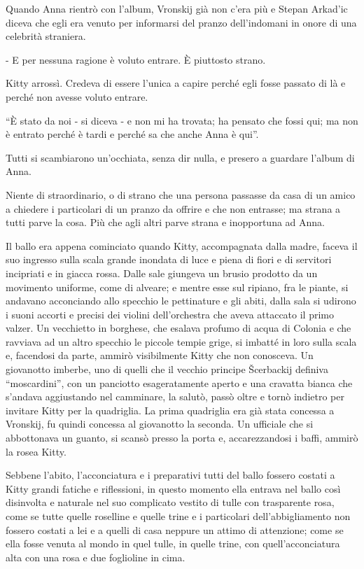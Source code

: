 Quando Anna rientrò con l'album, Vronskij già non c'era più e Stepan Arkad'ic diceva che egli era venuto per informarsi del pranzo dell'indomani in onore di una celebrità straniera. 

- E per nessuna ragione è voluto entrare. È piuttosto strano. 

Kitty arrossì. Credeva di essere l'unica a capire perché egli fosse passato di là e perché non avesse voluto entrare. 

``È stato da noi - si diceva - e non mi ha trovata; ha pensato che fossi qui; ma non è entrato perché è tardi e perché sa che anche Anna è qui''. 

Tutti si scambiarono un'occhiata, senza dir nulla, e presero a guardare l'album di Anna. 

Niente di straordinario, o di strano che una persona passasse da casa di un amico a chiedere i particolari di un pranzo da offrire e che non entrasse; ma strana a tutti parve la cosa. Più che agli altri parve strana e inopportuna ad Anna. 

Il ballo era appena cominciato quando Kitty, accompagnata dalla madre, faceva il suo ingresso sulla scala grande inondata di luce e piena di fiori e di servitori incipriati e in giacca rossa. Dalle sale giungeva un brusio prodotto da un movimento uniforme, come di alveare; e mentre esse sul ripiano, fra le piante, si andavano acconciando allo specchio le pettinature e gli abiti, dalla sala si udirono i suoni accorti e precisi dei violini dell'orchestra che aveva attaccato il primo valzer. Un vecchietto in borghese, che esalava profumo di acqua di Colonia e che ravviava ad un altro specchio le piccole tempie grige, si imbatté in loro sulla scala e, facendosi da parte, ammirò visibilmente Kitty che non conosceva. Un giovanotto imberbe, uno di quelli che il vecchio principe Šcerbackij definiva ``moscardini'', con un panciotto esageratamente aperto e una cravatta bianca che s'andava aggiustando nel camminare, la salutò, passò oltre e tornò indietro per invitare Kitty per la quadriglia. La prima quadriglia era già stata concessa a Vronskij, fu quindi concessa al giovanotto la seconda. Un ufficiale che si abbottonava un guanto, si scansò presso la porta e, accarezzandosi i baffi, ammirò la rosea Kitty. 

Sebbene l'abito, l'acconciatura e i preparativi tutti del ballo fossero costati a Kitty grandi fatiche e riflessioni, in questo momento ella entrava nel ballo così disinvolta e naturale nel suo complicato vestito di tulle con trasparente rosa, come se tutte quelle roselline e quelle trine e i particolari dell'abbigliamento non fossero costati a lei e a quelli di casa neppure un attimo di attenzione; come se ella fosse venuta al mondo in quel tulle, in quelle trine, con quell'acconciatura alta con una rosa e due foglioline in cima. 

